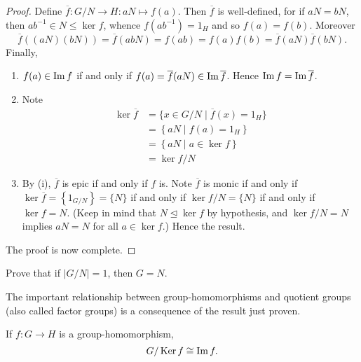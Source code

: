 \documentclass[11pt,a4paper]{article}
\begin{document}
\begin{proof}
Define \(\overline{f}\colon G/N \to H: aN\mapsto f(a    )\).
Then \(\overline{f} \) is well-defined, for if \(aN = bN\), then \(ab^{-1}\in N\leq \ker f\), whence \(f(ab^{-1}) =  1_H\) and so \(f(a) = f(b)\).
Moreover \[\overline{f}((aN)(bN)) = \overline{f}(abN) = f(ab) = f(a)f(b) = \overline{f}(aN) \overline{f}(bN).\]
Finally, 
\begin{enumerate}[label=(\roman*)]
    \item  \(f(a)\in\operatorname{Im} f \) if and only if  \(f(a) = \overline{f}(aN)  \in \operatorname{Im} \overline{f} \). Hence \(\operatorname{Im} f = \operatorname{Im} \overline{f}\).
\item 
    Note 
    \begin{align*}
        \ker \overline{f} &= \{x\in G/N \mid \overline{f}(x) = 1_H\}\\
        &= \left\{  aN \mid f(a) = 1_H \right\}\\
        &= \left\{ aN \mid a\in \ker f \right\}\\
        &= \ker f / N
    \end{align*}

    \item By (i), \(\overline{f} \) is epic if and only if \(f\) is.
     Note 
    \(\overline{f}\) is monic if and only if \(\ker \overline{f} = \left\{ 1_{G/N} \right\}   = \{ N\} \) if and only if \(\ker f / N  = \{N\}\) if and only if \(\ker f = N\).
    (Keep in mind that \(N\unlhd \ker f\) by hypothesis, and \(\ker f / N = N\)  implies \(aN  = N\) for all \(a \in \ker f\).) 
    Hence the result.
\end{enumerate}
The proof is now complete.
\end{proof}


\begin{eje}
    Prove that if \(|G/N| = 1\), then \(G = N\).
\end{eje}

 
The important relationship between group-homomorphisms and quotient groups (also called factor groups) is a consequence of the result just proven.

\begin{cor}
If \(f\colon G\to H\) is a group-homomorphism,  
\[G/ \operatorname{Ker} f  \cong \operatorname{Im} f.\]
    
\end{cor}
\end{document}
